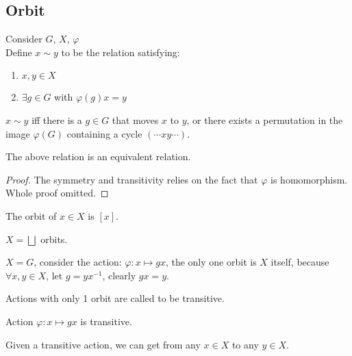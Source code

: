 \subsection{Orbit} \label{sec:}

\begin{definition} Consider $G$, $X$, $\varphi$
\\ Define $x \sim y$ to be the relation satisfying:
\begin{enumerate}
    \item $x,y \in X$
    \item $\exists g \in G$ with $\varphi(g)x=y$
\end{enumerate}
\end{definition}

\begin{intuition}
    $x \sim y$ iff there is a $g \in G$ that moves $x$ to $y$, or there exists a permutation in the image $\varphi(G)$ containing a cycle $(\cdots xy\cdots )$.
\end{intuition}

\begin{corollary}
The above relation is an equivalent relation.
\end{corollary}
\begin{proof}
The symmetry and transitivity relies on the fact that $\varphi$ is homomorphism. 
\\Whole proof omitted.
\end{proof}

\begin{definition}[orbit]
The orbit of $x \in X$ is $[x]$.
\end{definition}

\begin{remark}
$X = \bigsqcup$ orbits.
\end{remark}

\begin{eg}
$X = G$, consider the action: $\varphi: x \mapsto gx$, the only one orbit is $X$ itself, because $\forall x,y \in X$, let $g = yx^{-1}$, clearly $gx=y$.
\end{eg}

\begin{definition}
Actions with only 1 orbit are called to be transitive.
\end{definition}
\begin{remark}
Action $\varphi: x \mapsto gx$ is transitive.
\end{remark}
\begin{observe}
    Given a transitive action, we can get from any $x \in X$ to any $y \in X$.
\end{observe}

